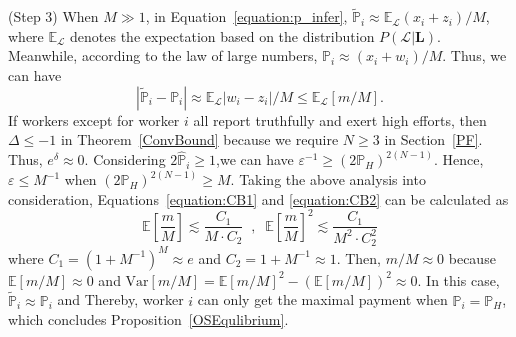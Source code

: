 (Step 3) When $M\gg 1$, in Equation~\ref{equation:p_infer}, $\tilde{\mathbb{P}}_i\approx \mathbb{E}_{\mathcal{L}}(x_i+z_i)/M$, where $\mathbb{E}_{\mathcal{L}}$ denotes the expectation based on the distribution $P(\mathcal{L}|\bm{L})$. Meanwhile, according to the law of large numbers, $\mathbb{P}_i\approx (x_i+w_i)/M$. Thus, we can have
\begin{equation}
|\tilde{\mathbb{P}}_i-\mathbb{P}_i|\approx \mathbb{E}_{\mathcal{L}}|w_i-z_i|/M\leq \mathbb{E}_{\mathcal{L}}\left[m/M\right].
\end{equation}
If workers except for worker $i$ all report truthfully and exert high efforts, then $\Delta \leq -1$ in Theorem~\ref{ConvBound} because we require $N\geq 3$ in Section~\ref{PF}.
Thus, $e^{\delta}\approx 0$.
Considering $2\hat{\mathbb{P}}_i\geq 1$,we can have $\varepsilon^{-1}\geq (2\mathbb{P}_H)^{2(N-1)}$.
Hence, $\varepsilon\leq M^{-1}$ when $(2\mathbb{P}_H)^{2(N-1)} \geq M$.
Taking the above analysis into consideration, Equations~\ref{equation:CB1} and \ref{equation:CB2} can be calculated as
\begin{equation}
\mathbb{E}\left[\frac{m}{M}\right]\lesssim \frac{C_{1}}{M\cdot C_2}\;\;, \;\;\mathbb{E}\left[\frac{m}{M}\right]^2\lesssim \frac{C_{1}}{M^2\cdot C_2^2}
\end{equation}
where $C_{1}=(1+M^{-1})^{M}\approx e$ and $C_{2}=1+M^{-1}\approx 1$.
Then, $m/M\approx 0$ because $\mathbb{E}[m/M]\approx 0$ and $\mathrm{Var}[m/M]=\mathbb{E}[m/M]^2-(\mathbb{E}[m/M])^2 \approx 0$.
In this case, $\tilde{\mathbb{P}}_i\approx \mathbb{P}_i$ and 
Thereby, worker $i$ can only get the maximal payment when $\mathbb{P}_i=\mathbb{P}_H$, which concludes Proposition~\ref{OSEqulibrium}.

